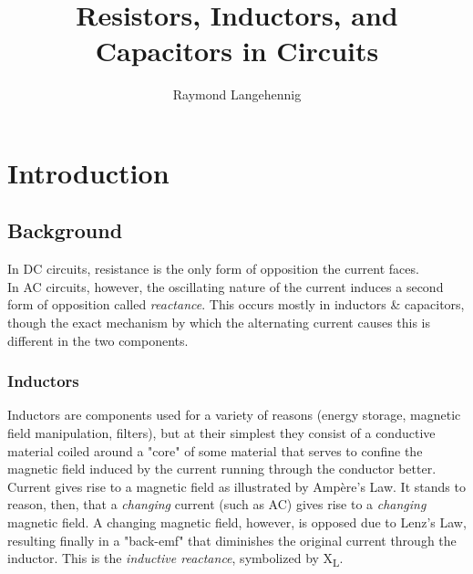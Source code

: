 \documentclass{article}
\title{Resistors, Inductors, and Capacitors in Circuits}
\author{Raymond Langehennig}
\begin{document}
\maketitle

	\section{Introduction}
		\subsection{Background}
			In DC circuits, resistance is the only form of opposition the current faces.\\
			In AC circuits, however, the oscillating nature of the current induces a second form of opposition called \emph{reactance}. This occurs mostly in inductors \& capacitors, though the exact mechanism by which the alternating current causes this is different in the two components.
			
			\subsubsection*{Inductors}
				Inductors are components used for a variety of reasons (energy storage, magnetic field manipulation, filters), but at their simplest they consist of a conductive material coiled around a "core" of some material that serves to confine the magnetic field induced by the current running through the conductor better.\\
				Current gives rise to a magnetic field as illustrated by Amp\`ere's Law. It stands to reason, then, that a \emph{changing} current (such as AC) gives rise to a \emph{changing} magnetic field. A changing magnetic field, however, is opposed due to Lenz's Law, resulting finally in a "back-emf" that diminishes the original current through the inductor. This is the \emph{inductive reactance}, symbolized by X\textsubscript{L}.
\end{document}
